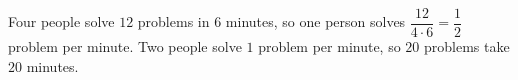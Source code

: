Four people solve $12$ problems in $6$ minutes, so one person solves $\dfrac{12}{4\cdot6}=\dfrac12$ problem per minute. Two people solve $1$ problem per minute, so $20$ problems take $\boxed{20}$ minutes.
